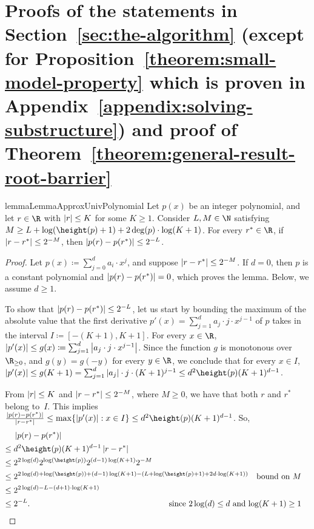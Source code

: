 \section{Proofs of the statements in Section~\ref{sec:the-algorithm} (except for Proposition~\ref{theorem:small-model-property} which is proven in Appendix~\ref{appendix:solving-substructure}) and proof of Theorem~\ref{theorem:general-result-root-barrier}}
\label{appendix:useful-lemmas}

\begin{restatable}{lemma}{LemmaApproxUnivPolynomial}
  \label{lemma:approx-univ-polynomial}
  Let $p(x)$ be an integer polynomial, 
  and let ${r \in \R}$ with $\left|r\right| \leq K$ for some $K \geq 1$.
  Consider $L,M \in \N$ satisfying 
  $M\geq L + \log(\height(p)+1) + 2 \deg(p) \cdot \log(K+1)$.
  For every $r^* \in \R$, if $\left|r-r^*\right| \leq 2^{-M}$, 
  then $\left|p(r)-p(r^*)\right| \leq 2^{-L}$.
\end{restatable}

\begin{proof} 
  Let $p(x) \coloneqq \sum_{j=0}^d a_i \cdot x^j$, and
  suppose $\left|r-r^*\right| \leq 2^{-M}$.
  If $d = 0$, then $p$ is a constant polynomial and $\left|p(r)-p(r^*)\right| = 0$, 
  which proves the lemma. 
  Below, we assume $d \geq 1$.

  To show that $\left|p(r)-p(r^*)\right| \leq 2^{-L}$, let us start by bounding the maximum of the absolute value
  that the first derivative $p'(x) = \sum_{j=1}^d a_j \cdot j \cdot x^{j-1}$ of
  $p$ takes in the interval $I \coloneqq [-(K+1),K+1]$. For every $x \in \R$, $\left|p'(x)\right| \leq
  g(x) \coloneqq \sum_{j=1}^d \left|a_j \cdot j \cdot x^{j-1}\right|$. Since the
  function $g$ is monotonous over $\R_{\geq 0}$, and $g(y) = g(-y)$ for every $y
  \in \R$, we conclude that for every $x \in I$, $\abs{p'(x)} \leq g(K+1) =
  \sum_{j=1}^d \abs{a_j} \cdot j \cdot (K+1)^{j-1} \leq d^2 \height(p) (K+1)^{d-1}$. 
  
  From $\left|r\right| \leq K$ and $\left|r-r^*\right| \leq 2^{-M}$, where $M \geq 0$, 
  we have that both $r$ and $r^*$ belong to~$I$.
  This implies $\frac{\abs{p(r) -
  p(r^*)}}{\abs{r-r^*}} \leq \max\{\abs{p'(x)} : x \in I \} \leq
  d^2 \height(p) (K+1)^{d-1}$. So,
  \begin{align*}
    & \abs{p(r) - p(r^*)}\\
    \leq{}& d^2 \height(p) (K+1)^{d-1} \abs{r-r^*}\\
    \leq{}& 2^{2 \log(d)} 2^{\log(\height(p))} 2^{(d-1)\log(K+1)} 2^{-M}
    \\
    \leq{}& 2^{2 \log(d)+\log(\height(p))+(d-1)\log(K+1)-(L + \log(\height(p)+1) + 2 d \cdot \log(K+1))}
    & \text{bound on $M$}\\
    \leq{}& 2^{2 \log(d)-L-(d+1) \cdot \log(K+1)}\\
    \leq{}& 2^{-L}.
    &\hspace{-4.5cm}\text{since $2 \log(d) \leq d$ and $\log(K+1) \geq 1$}&\qedhere
  \end{align*}
\end{proof}

